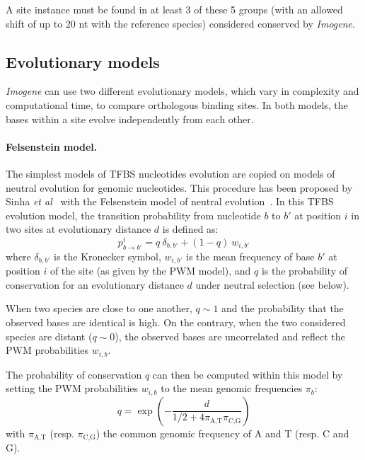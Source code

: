 \documentclass[a4,center,fleqn]{NAR}
\newcommand{\pa}{\pi_\textrm{A,T}}
\newcommand{\pc}{\pi_\textrm{C,G}}
\begin{document}
A site instance must be found in at least 3 of these 5 groups (with an allowed
shift of up to 20 nt with the reference species) considered conserved by {\em
Imogene}.


\subsection*{Evolutionary models}

{\em Imogene} can use two different evolutionary models, which vary in
complexity and computational time, to compare orthologous binding sites.
In both models, the bases within a site evolve independently from each other. 
\\

\paragraph{Felsenstein model. }

The simplest models of TFBS nucleotides evolution are copied on models of
neutral evolution for genomic nucleotides.
This procedure has been proposed by Sinha \textsl{et al}~\cite{Sinha:2003vn,
siddharthan2005phylogibbs}  with the Felsenstein model of neutral
evolution~\cite{Felsenstein:1981ve}.
In this TFBS evolution model, the transition probability from nucleotide $b$ to
$b'$ at position $i$ in two sites at evolutionary distance $d$ is defined as:
\begin{equation}
    p_{b\rightarrow b'}^i=q\ \delta_{b,b'}+(1-q)\ w_{i,b'}
    \label{felsenstein-integr-TF}
\end{equation}
where $\delta_{b,b'}$ is the Kronecker symbol, $w_{i,b'}$ is the mean frequency
of base $b'$ at position $i$ of the site (as given by the PWM model), and $q$ is
the probability of conservation for an evolutionary distance  $d$ under neutral
selection (see below).

When two species are close to one another, $q\sim1$ and the probability that
the observed bases are identical is high.
On the contrary, when the two considered species are distant ($q\sim0$), the
observed bases are uncorrelated and reflect the PWM probabilities $w_{i,b}$.

The probability of conservation $q$ can then be computed within this model by
setting the PWM probabilities $w_{i,b}$ to the mean genomic frequencies
$\pi_b$:
\begin{equation}
        q=\exp\left(-\frac{d}{1/2+4\pa\pc}\right) \label{q-felsen-TF}
\end{equation}
with $\pa$ (resp. $\pc$) the common genomic frequency of A and T (resp. C and
G).
\end{document}
